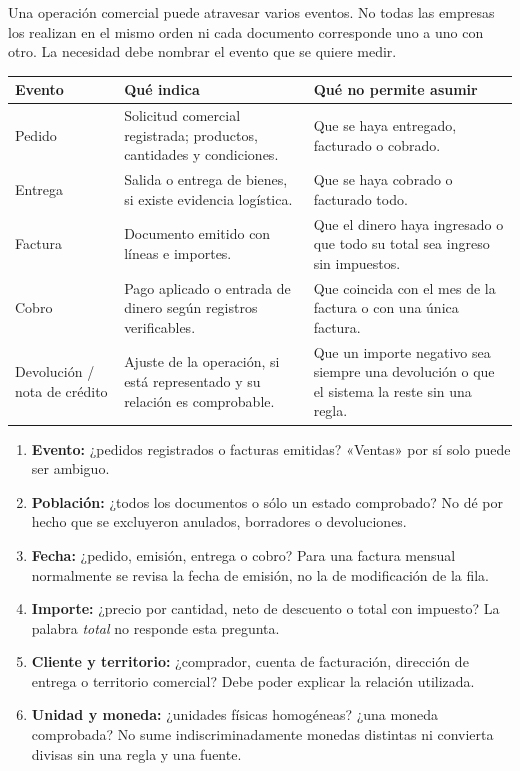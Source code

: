 Una operación comercial puede atravesar varios eventos. No todas las empresas los realizan en el mismo orden ni cada documento corresponde uno a uno con otro. La necesidad debe nombrar el evento que se quiere medir.
\begin{tabularx}{\linewidth}{@{}p{27mm}YY@{}}
\toprule
\textbf{Evento}&\textbf{Qué indica}&\textbf{Qué no permite asumir}\\
\midrule
Pedido&Solicitud comercial registrada; productos, cantidades y condiciones.&Que se haya entregado, facturado o cobrado.\\
Entrega&Salida o entrega de bienes, si existe evidencia logística.&Que se haya cobrado o facturado todo.\\
Factura&Documento emitido con líneas e importes.&Que el dinero haya ingresado o que todo su total sea ingreso sin impuestos.\\
Cobro&Pago aplicado o entrada de dinero según registros verificables.&Que coincida con el mes de la factura o con una única factura.\\
Devolución / nota de crédito&Ajuste de la operación, si está representado y su relación es comprobable.&Que un importe negativo sea siempre una devolución o que el sistema la reste sin una regla.\\
\bottomrule
\end{tabularx}
\begin{enumerate}
\item \textbf{Evento:} ¿pedidos registrados o facturas emitidas? «Ventas» por sí solo puede ser ambiguo.
\item \textbf{Población:} ¿todos los documentos o sólo un estado comprobado? No dé por hecho que se excluyeron anulados, borradores o devoluciones.
\item \textbf{Fecha:} ¿pedido, emisión, entrega o cobro? Para una factura mensual normalmente se revisa la fecha de emisión, no la de modificación de la fila.
\item \textbf{Importe:} ¿precio por cantidad, neto de descuento o total con impuesto? La palabra \emph{total} no responde esta pregunta.
\item \textbf{Cliente y territorio:} ¿comprador, cuenta de facturación, dirección de entrega o territorio comercial? Debe poder explicar la relación utilizada.
\item \textbf{Unidad y moneda:} ¿unidades físicas homogéneas? ¿una moneda comprobada? No sume indiscriminadamente monedas distintas ni convierta divisas sin una regla y una fuente.
\end{enumerate}
